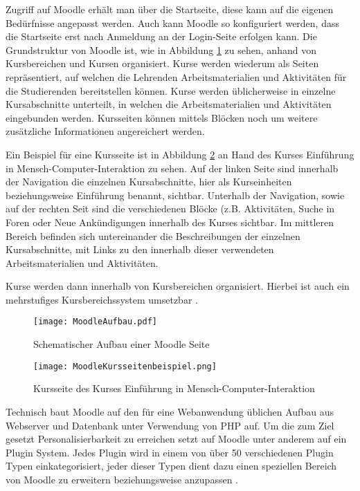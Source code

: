 Zugriff auf Moodle erhält man über die Startseite, diese kann auf die eigenen Bedürfnisse angepasst werden. Auch kann Moodle so konfiguriert werden, dass die Startseite erst nach Anmeldung an der Login-Seite erfolgen kann. Die Grundstruktur von Moodle ist, wie in Abbildung \ref{fig:MoodleAufbau} zu sehen, anhand von Kursbereichen und Kursen organisiert. Kurse werden wiederum als Seiten repräsentiert, auf welchen die Lehrenden Arbeitsmaterialien und Aktivitäten für die Studierenden bereitstellen können. Kurse werden üblicherweise in einzelne Kursabschnitte unterteilt, in welchen die Arbeitsmaterialien und Aktivitäten eingebunden werden. Kursseiten können mittels Blöcken noch um weitere zusätzliche Informationen angereichert werden.

Ein Beispiel für eine Kursseite ist in Abbildung \ref{fig:MoodleKursseitenbeispiel} an Hand des Kurses \glqq Einführung in Mensch-Computer-Interaktion\grqq{} zu sehen. Auf der linken Seite sind innerhalb der Navigation die einzelnen Kursabschnitte, hier als Kurseinheiten beziehungsweise Einführung  benannt, sichtbar. Unterhalb der Navigation, sowie auf der rechten Seit sind die verschiedenen Blöcke (z.B. \glqq Aktivitäten\grqq{}, \glqq Suche in Foren\grqq{} oder \glqq Neue Ankündigungen\grqq{} innerhalb des Kurses sichtbar. Im mittleren Bereich befinden sich untereinander die Beschreibungen der einzelnen Kursabschnitte, mit Links zu den innerhalb dieser verwendeten Arbeitsmaterialien und Aktivitäten.

Kurse werden dann innerhalb von Kursbereichen organisiert. Hierbei ist auch ein mehrstufiges Kursbereichssystem umsetzbar \citep{moodle2015aufbau}.

\begin{figure}[h!]
\texttt{[image: MoodleAufbau.pdf]}
\caption{\label{fig:MoodleAufbau}Schematischer Aufbau einer Moodle Seite}
\end{figure}

\begin{figure}[h!]
\texttt{[image: MoodleKursseitenbeispiel.png]}
\caption{\label{fig:MoodleKursseitenbeispiel}Kursseite des Kurses \glqq Einführung in Mensch-Computer-Interaktion\grqq{} \citep{fernuniversitaet2018mensch}}
\end{figure}

Technisch baut Moodle auf den für eine Webanwendung üblichen Aufbau aus Webserver und Datenbank unter Verwendung von PHP auf. Um die zum Ziel gesetzt Personalisierbarkeit zu erreichen setzt auf Moodle unter anderem auf ein Plugin System. Jedes Plugin wird in einem von über 50 verschiedenen Plugin Typen einkategorisiert, jeder dieser Typen dient dazu einen speziellen Bereich von Moodle zu erweitern beziehungsweise anzupassen \citep{moodle2017plugin}.


